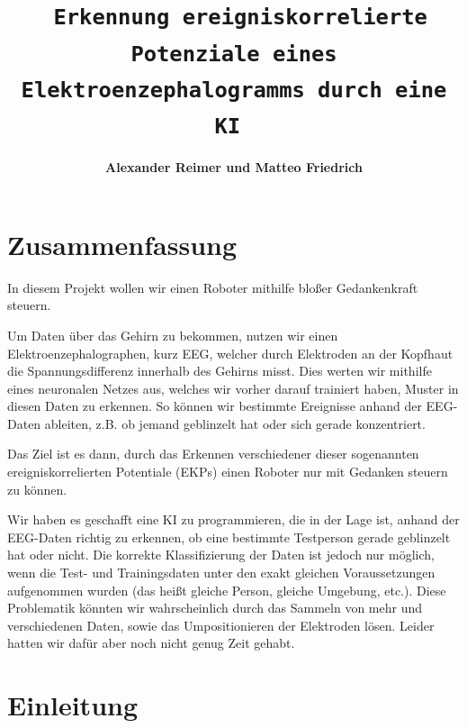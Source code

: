 \documentclass{scrartcl}
\title{\textbf{\Huge 
\texttt{
	Erkennung ereigniskorrelierte Potenziale eines Elektroenzephalogramms durch eine KI
}
} \\ \vspace{20mm}}
\date{}
\author[]{\textbf{\huge Alexander Reimer und Matteo Friedrich}}
\affil[]{\textbf{\LARGE Gymnasium Eversten Oldenburg} \\ \vspace{10mm} \textbf{\Large Betreuer: Herr Dr. Glade \& Herr Husemeyer}}
\begin{document}


	\newcommand{\sig}{\textrm{sig}}
	\newcommand{\netin}{\textrm{netzinput}}

	\newcommand{\threesub}[1]{
	\vspace{1.5ex}
	\noindent {\textbf{#1}}
	\vspace{0.5ex}
	}

	\maketitle

	\newpage
	
	\tableofcontents
	
	\newpage

	\section{Zusammenfassung}


	In diesem Projekt wollen wir einen Roboter mithilfe bloßer Gedankenkraft steuern.

	Um Daten über das Gehirn zu bekommen, nutzen wir einen Elektroenzephalographen, kurz EEG, welcher durch Elektroden an der Kopfhaut die Spannungsdifferenz innerhalb des Gehirns misst. Dies werten wir mithilfe eines neuronalen Netzes aus, welches wir vorher darauf trainiert haben, Muster in diesen Daten zu erkennen. So können wir bestimmte Ereignisse anhand der EEG-Daten ableiten, z.B. ob jemand geblinzelt hat oder sich gerade konzentriert.
	
	Das Ziel ist es dann, durch das Erkennen verschiedener dieser sogenannten ereigniskorrelierten Potentiale (EKPs) einen Roboter nur mit Gedanken steuern zu können.
	
	
	Wir haben es geschafft eine KI zu programmieren, die in der Lage ist, anhand der EEG-Daten richtig zu erkennen, ob eine bestimmte Testperson gerade geblinzelt hat oder nicht. Die korrekte Klassifizierung der Daten ist jedoch nur möglich, wenn die Test- und Trainingsdaten unter den exakt gleichen Voraussetzungen aufgenommen wurden (das heißt gleiche Person, gleiche Umgebung, etc.). Diese Problematik könnten wir wahrscheinlich durch das Sammeln von mehr und verschiedenen Daten, sowie das Umpositionieren der Elektroden lösen. Leider hatten wir dafür aber noch nicht genug Zeit gehabt.	

	\section{Einleitung}
\end{document}
